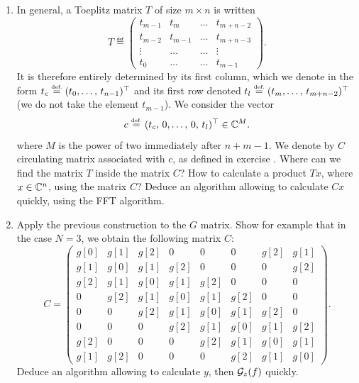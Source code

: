 \begin{exo}
\begin{enumerate}
\item In general, a Toeplitz matrix $ T $ of size $ m \times n $ is written
\begin{equation*}
T \eqdef \begin{pmatrix} t_{m-1} & t_{m} & \ldots & t_{m + n-2} \\t_{m-2} & t_{m-1} & \ldots & t_{m + n-3} \\\vdots & \ldots & \ldots & \vdots \\t_0 & \ldots & \ldots & t_{m-1} \end{pmatrix}.
\end{equation*}
It is therefore entirely determined by its first column, which we denote in the form $ t_c \stackrel{\mbox{\upshape\tiny def.}}{=} (t_0, \ldots, \, t_{n-1})^\top $ and its first row denoted $ t_{l} \stackrel{\mbox{\upshape\tiny def.}}{=} (t_m, \ldots, \, t_{m + n-2})^\top $ (we do not take the element $ t_{m-1} $). We consider the vector
\begin{equation*}
c \stackrel{\mbox{\upshape\tiny def.}}{=} (t_c, \, 0, \ldots, \, 0, \, t_l)^\top \in \mathbb{C}^{M}.
\end{equation*}
 where $ M $ is the power of two immediately after $ n + m-1 $. We denote by $ C $ circulating matrix associated with $ c $, as defined in exercise . Where can we find the matrix $ T $ inside the matrix $ C $? How to calculate a product $ T x $, where $ x \in \mathbb{C}^n $, using the matrix $ C $? Deduce an algorithm allowing to calculate $ C x $ quickly, using the FFT algorithm.
\item Apply the previous construction to the $ G $ matrix. Show for example that in the case $ N = 3 $, we obtain the following matrix $ C $:
\begin{equation*}
C = \begin{pmatrix} g [0] & g [1] & g [2] & 0 & 0 & 0 & g [2] & g [1] \\g [1] & g [0] & g [1] & g [2] & 0 & 0 & 0 & g [2] \\g [2] & g [1] & g [0] & g [1] & g [2] & 0 & 0 & 0 \\0 & g [2] & g [1] & g [0] & g [1] & g [2] & 0 & 0 \\0 & 0 & g [2] & g [1] & g [0] & g [1] & g [2] & 0 \\0 & 0 & 0 & g [2] & g [1] & g [0] & g [1] & g [2] \\g [2] & 0 & 0 & 0 & g [2] & g [1] & g [0] & g [1] \\g [1] & g [2] & 0 & 0 & 0 & g [2 ] & g [1] & g [0] \end{pmatrix}.
\end{equation*}
Deduce an algorithm allowing to calculate $ y $, then $ \mathcal{G}_z (f) $ quickly.
\end{enumerate}
\end{exo}
 
